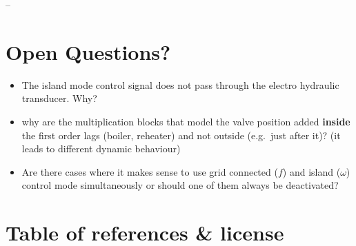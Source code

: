 \documentclass[
  a4paper,
  DIV=11,
  numbers=noendperiod]{scrartcl}
\providecommand{\tightlist}{%
  \setlength{\itemsep}{0pt}\setlength{\parskip}{0pt}}\usepackage{longtable,booktabs,array}
\begin{document}
--

\section{Open Questions?}\label{open-questions}

\begin{itemize}
\tightlist
\item
  The island mode control signal does not pass through the electro
  hydraulic transducer. Why?
\item
  why are the multiplication blocks that model the valve position added
  \textbf{inside} the first order lags (boiler, reheater) and not
  outside (e.g.~just after it)? (it leads to different dynamic
  behaviour)
\item
  Are there cases where it makes sense to use grid connected (\(f\)) and
  island (\(\omega\)) control mode simultaneously or should one of them
  always be deactivated?
\end{itemize}

\section{Table of references \&
license}\label{table-of-references-license}
\end{document}
